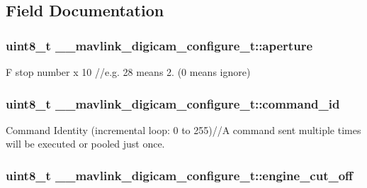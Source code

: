 \subsection{Field Documentation}
\hypertarget{struct____mavlink__digicam__configure__t_ab5d03d83e0e818d91f35f07dca0ea867}{
\subsubsection[{aperture}]{\setlength{\rightskip}{0pt plus 5cm}uint8\+\_\+t \+\_\+\+\_\+mavlink\+\_\+digicam\+\_\+configure\+\_\+t\+::aperture}}\label{struct____mavlink__digicam__configure__t_ab5d03d83e0e818d91f35f07dca0ea867}


F stop number x 10 //e.g. 28 means 2. (0 means ignore) 

\hypertarget{struct____mavlink__digicam__configure__t_a204566a1306c60b8ae2357058087ce9f}{
\subsubsection[{command\+\_\+id}]{\setlength{\rightskip}{0pt plus 5cm}uint8\+\_\+t \+\_\+\+\_\+mavlink\+\_\+digicam\+\_\+configure\+\_\+t\+::command\+\_\+id}}\label{struct____mavlink__digicam__configure__t_a204566a1306c60b8ae2357058087ce9f}


Command Identity (incremental loop\+: 0 to 255)//\+A command sent multiple times will be executed or pooled just once. 

\hypertarget{struct____mavlink__digicam__configure__t_a489d95fe85c951cb65ad856ee834cde4}{
\subsubsection[{engine\+\_\+cut\+\_\+off}]{\setlength{\rightskip}{0pt plus 5cm}uint8\+\_\+t \+\_\+\+\_\+mavlink\+\_\+digicam\+\_\+configure\+\_\+t\+::engine\+\_\+cut\+\_\+off}}\label{struct____mavlink__digicam__configure__t_a489d95fe85c951cb65ad856ee834cde4}


